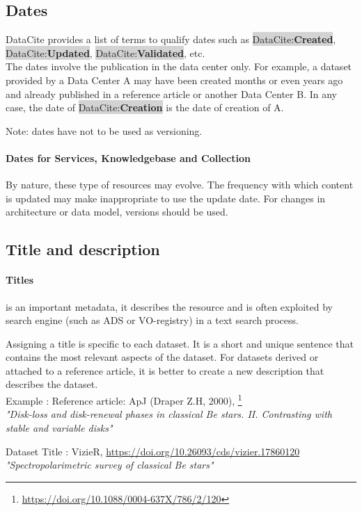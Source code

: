 \documentclass[11pt,a4paper]{ivoa}
\newcommand{\dataciteterm}[1]{\colorbox{lightgray}{DataCite:\textbf{#1}}}
\begin{document}
\subsection{Dates}
\label{sec:dates}
DataCite provides a list of terms to qualify dates such as \dataciteterm{Created}, \dataciteterm{Updated}, \dataciteterm{Validated}, etc.\\

The dates involve the publication in the data center only.
For example, a dataset provided by a Data Center A may have been created months or even years ago and already published in a reference article or another Data Center B. In any case, the date of \dataciteterm{Creation} is the date of creation of A.

Note: dates have not to be used as versioning.

\paragraph{Dates for Services, Knowledgebase and Collection}
By nature, these type of resources may evolve. The frequency with which content is updated may make inappropriate to use the update date. For changes in architecture or data model, versions should be used.


\subsection{Title and description}
\label{sec:title}
\paragraph{Titles} is an important metadata, it describes the resource and is often exploited by search engine (such as ADS or VO-registry) in a text search process.


Assigning a title is specific to each dataset. 
It is a short and unique sentence that contains the most relevant aspects of the dataset.
For datasets derived or attached to a reference article, it is better to create a new description that describes the dataset.\\


Example : Reference article: ApJ (Draper Z.H, 2000), \footnote{\url{https://doi.org/10.1088/0004-637X/786/2/120}}\\
\textit{"Disk-loss and disk-renewal phases in classical Be stars. II. Contrasting with stable and variable disks"}


Dataset Title : VizieR, \url{https://doi.org/10.26093/cds/vizier.17860120} \\
\textit{"Spectropolarimetric survey of classical Be stars"}\\
\end{document}
